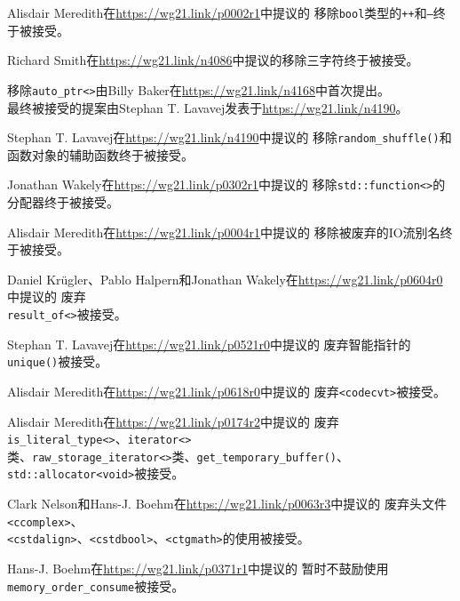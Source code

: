 Alisdair Meredith在\url{https://wg21.link/p0002r1}中提议的
移除\texttt{bool}类型的\texttt{++}和\texttt{--}终于被接受。

Richard Smith在\url{https://wg21.link/n4086}中提议的移除三字符终于被接受。

移除\texttt{auto\_ptr<>}由Billy Baker在\url{https://wg21.link/n4168}中首次提出。\\
最终被接受的提案由Stephan T. Lavavej发表于\url{https://wg21.link/n4190}。

Stephan T. Lavavej在\url{https://wg21.link/n4190}中提议的
移除\texttt{random\_shuffle()}和函数对象的辅助函数终于被接受。

Jonathan Wakely在\url{https://wg21.link/p0302r1}中提议的
移除\texttt{std::function<>}的分配器终于被接受。

Alisdair Meredith在\url{https://wg21.link/p0004r1}中提议的
移除被废弃的IO流别名终于被接受。

Daniel Krügler、Pablo Halpern和Jonathan Wakely在\url{https://wg21.link/p0604r0}中提议的
废弃\\
\texttt{result\_of<>}被接受。

Stephan T. Lavavej在\url{https://wg21.link/p0521r0}中提议的
废弃智能指针的\texttt{unique()}被接受。

Alisdair Meredith在\url{https://wg21.link/p0618r0}中提议的
废弃\texttt{<codecvt>}被接受。

Alisdair Meredith在\url{https://wg21.link/p0174r2}中提议的
废弃\texttt{is\_literal\_type<>}、\texttt{iterator<>}\\
类、\texttt{raw\_storage\_iterator<>}类、\texttt{get\_temporary\_buffer()}、
\texttt{std::allocator<void>}被接受。

Clark Nelson和Hans-J. Boehm在\url{https://wg21.link/p0063r3}中提议的
废弃头文件\texttt{<ccomplex>}、\\
\texttt{<cstdalign>}、\texttt{<cstdbool>}、\texttt{<ctgmath>}的使用被接受。

Hans-J. Boehm在\url{https://wg21.link/p0371r1}中提议的
暂时不鼓励使用\texttt{memory\_order\_consume}被接受。